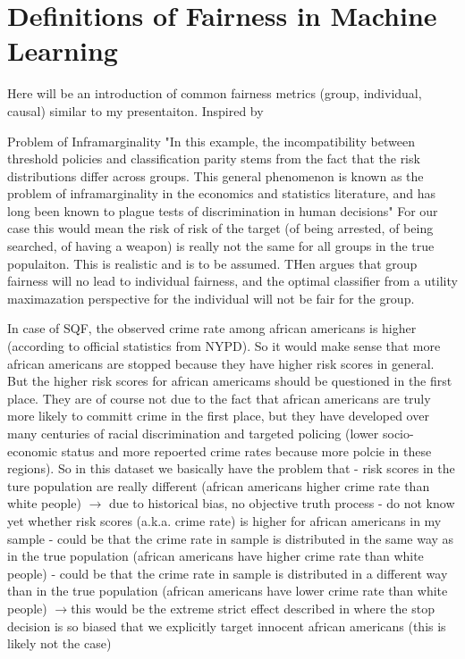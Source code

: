 \section*{Definitions of Fairness in Machine Learning}
Here will be an introduction of common fairness metrics (group, individual, causal) similar to my
presentaiton.
Inspired by \cite{verma2018} \cite{caton2024} \cite{castelnovo2022}

Problem of Inframarginality \cite{corbett-davies}
"In this example, the incompatibility between threshold policies and classification parity stems from the fact that
the risk distributions differ across groups. This general phenomenon is known as the problem of inframarginality in
the economics and statistics literature, and has long been known to plague tests of discrimination in human decisions"
For our case this would mean the risk of risk of the target (of being arrested, of being searched, of having a weapon)
is really not the same for all groups in the true populaiton. This is realistic and is to be assumed. THen \cite{corbett-davies}
argues that group fairness will no lead to individual fairness, and the optimal classifier from a utility maximazation perspective
for the individual will not be fair for the group.

In case of SQF, the observed crime rate among african americans is higher (according to official statistics from NYPD).
So it would make sense that more african americans are stopped because they have higher risk scores in general. But the higher risk
scores for african americams should be questioned in the first place. They are of course not due to the fact that african americans
are truly more likely to committ crime in the first place, but they have developed over many centuries of racial discrimination
and targeted policing (lower socio-economic status and more repoerted crime rates because more polcie in these regions).
So in this dataset we basically have the problem that
- risk scores in the ture population are really different (african americans higher crime rate than white people) $\rightarrow$ due to historical bias, no objective truth process
- do not know yet whether risk scores (a.k.a. crime rate) is higher for african americans in my sample
- could be that the crime rate in sample is distributed in the same way as in the true population (african americans have higher crime rate than white people)
- could be that the crime rate in sample is distributed in a different way than in the true population (african americans have lower crime rate than white people)
$\rightarrow$this would be the extreme strict effect described in \cite{kallus} where the stop decision is so
biased that we explicitly target innocent african americans (this is likely not the case)

